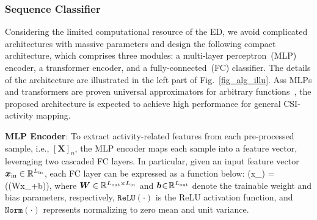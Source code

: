 \subsubsection{Sequence Classifier}\label{s3ec_seq_class}
Considering the limited computational resource of the ED, we avoid complicated architectures with massive parameters and design the following compact architecture, which comprises three modules: a multi-layer perceptron~(MLP) encoder, a transformer encoder, and a fully-connected~(FC) classifier.
The details of the architecture are illustrated in the left part of Fig.~\ref{fig_alg_illu}.
Ass MLPs and transformers are proven universal approximators for arbitrary functions~\cite{Chen1995Universal,Yun2020ICLR_Are}, the proposed architecture is expected to achieve high performance for general CSI-activity mapping.

\textbf{MLP Encoder}: To extract activity-related features from each pre-processed sample, i.e., $[\bm X]_n$, the MLP encoder maps each sample into a feature vector, leveraging two cascaded FC layers.
In particular, given an input feature vector $\bm x_{\mathrm{in}}\in \mathbb R^{L_{\mathrm{in}}}$, each FC layer can be expressed as a function below:
\beq\label{equ_fc_expression}
(\bm x_{\rin}) = \big((\bm W\bm x_{\rin}+\bm b)\big),
\eeq
where $\bm W\in\mathbb R^{L_{\mathrm{out}}\times L_{\mathrm{in}}}$ and $\bm b \!\in\! \mathbb R^{L_{\mathrm{out}}}$ denote the trainable weight and bias parameters, respectively,
$\mathtt{ReLU}(\cdot)$ is the ReLU activation function,
and $\mathtt{Norm}(\cdot)$ represents normalizing to zero mean and unit variance.


